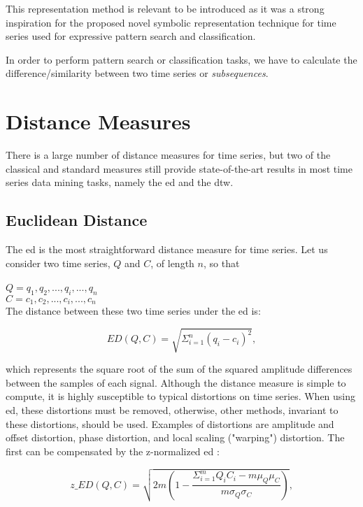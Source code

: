 This representation method is relevant to be introduced as it was a strong inspiration for the proposed novel symbolic representation technique for time series used for expressive pattern search and classification. 

In order to perform pattern search or classification tasks, we have to calculate the difference/similarity between two time series or \textit{subsequences}.

\section{Distance Measures}
\label{sec:distance}

There is a large number of distance measures for time series, but two of the classical and standard measures still provide state-of-the-art results in most time series data mining tasks, namely the \gls{ed} and the \gls{dtw}.

\subsection{Euclidean Distance}
\label{subsec:ed}

The \gls{ed} is the most straightforward distance measure for time series. Let us consider two time series, $Q$ and $C$, of length $n$, so that\\
\\
$Q = q_1, q_2, ..., q_i, ..., q_n$\\
$C = c_1, c_2, ..., c_i, ..., c_n$\\

The distance between these two time series under the \gls{ed} is:

\begin{equation}
ED(Q,C) = \sqrt{\Sigma^n_{i=1} (q_i - c_i)^2},
\end{equation}

which represents the square root of the sum of the squared amplitude differences between the samples of each signal. Although the distance measure is simple to compute, it is highly susceptible to typical distortions on time series. When using \gls{ed}, these distortions must be removed, otherwise, other methods, invariant to these distortions, should be used. Examples of distortions are amplitude and offset distortion, phase distortion, and local scaling ("warping") distortion. The first can be compensated by the z-normalized \gls{ed} \cite{complexity}:

\begin{equation}
\label{eq:norm_ed}
z\_ED(Q,C) = \sqrt{2m(1-\frac{\Sigma^m_{i=1}Q_iC_i - m\mu_Q\mu_C}{m\sigma_Q\sigma_C})},
\end{equation}

